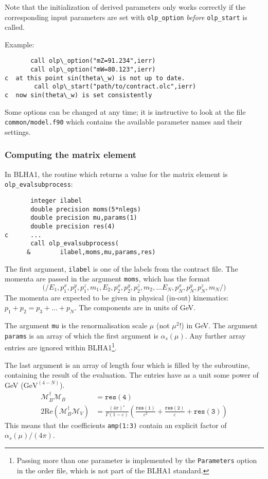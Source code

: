 Note that the initialization of derived parameters only works correctly
if the corresponding input parameters are set with \texttt{olp\_option}
\emph{before} \texttt{olp\_start} is called.

Example:
\begin{lstlisting}
       call olp\_option("mZ=91.234",ierr)
       call olp\_option("mW=80.123",ierr)
c  at this point sin(theta\_w) is not up to date.
        call olp\_start("path/to/contract.olc",ierr)
c  now sin(theta\_w) is set consistently
\end{lstlisting}

Some options can be changed at any time; it is instructive to 
look at the file
\texttt{common/model.f90} which contains  the available
parameter names and  their settings.

\subsubsection{Computing the matrix element}

In BLHA1, the routine which returns a value for the matrix element is
\texttt{olp\_evalsubprocess}:
\begin{lstlisting}
       integer ilabel
       double precision moms(5*nlegs)
       double precision mu,params(1)
       double precision res(4)
c      ...
       call olp_evalsubprocess(
      &        ilabel,moms,mu,params,res)
\end{lstlisting}

The first argument, \texttt{ilabel} is one of the labels from the
contract file. The momenta are passed in the argument \texttt{moms},
which has the format
\begin{displaymath}
\mathtt{(/}
E_1, p^x_1, p^y_1, p^z_1, m_1,
E_2, p^x_2, p^y_2, p^z_2, m_2, \ldots
E_N, p^x_N, p^y_N, p^z_N, m_N
\mathtt{/)}
\end{displaymath}
The momenta are expected to be given in physical (in-out) 
kinematics: $p_1+p_2=p_3+\ldots+p_N$.
The components are in units of GeV.

The argument \texttt{mu} is the renormalisation scale $\mu$ (not $\mu^2$!)
in GeV. The argument {\tt params} is an array of which the first argument is
$\alpha_s(\mu)$. Any further array entries are ignored within BLHA1\footnote{
Passing more than one parameter is implemented by the \texttt{Parameters}
option in the order file, which is  not part of the BLHA1 standard.}.

The last argument is an array of length four which is filled by the subroutine, 
containing the result of the evaluation. The entries have as a unit some
power of GeV ($\mathrm{GeV}^{(4-N)}$).
\begin{align}
\label{eq:res}
\mathcal{M}_B^\dagger\mathcal{M}_B&=\mathtt{res(4)}\nonumber\\
2\mathrm{Re}\left(\mathcal{M}_B^\dagger\mathcal{M}_V\right)&=
\frac{(4\pi)^\varepsilon}{\Gamma(1-\varepsilon)}\left(
\frac{\mathtt{res(1)}}{\varepsilon^2}
+\frac{\mathtt{res(2)}}{\varepsilon}
+\mathtt{res(3)}
\right)
\end{align}
This means that the coefficients \texttt{amp(1:3)} contain
an explicit factor of $\alpha_s(\mu)/(4\pi)$.

